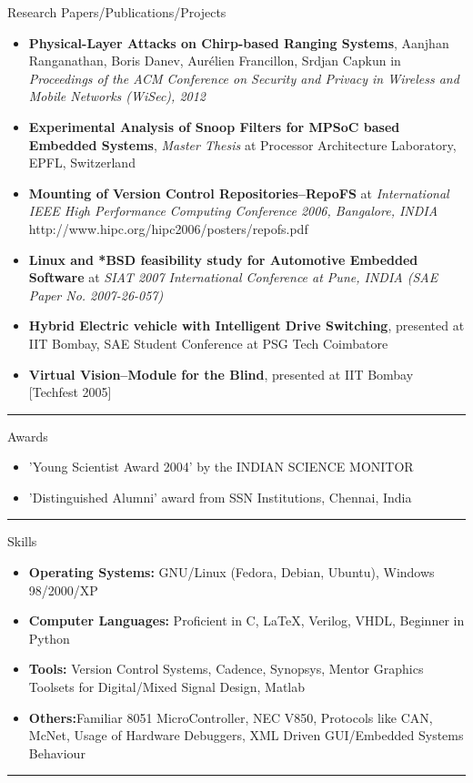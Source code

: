 \documentclass[11pt,oneside]{article}
\newenvironment{ressection}[1]{
	\vspace{4pt}
	{\fontfamily{phv}\selectfont\Large#1}
	\begin{itemize}
	\vspace{3pt}
}{
	\end{itemize}
}
\newcommand{\resitem}[1]{
	\vspace{-4pt}
	\item \begin{flushleft} #1 \end{flushleft}
}
\begin{document}
\begin{ressection}{Research Papers/Publications/Projects}
        \resitem{\textbf{Physical-Layer Attacks on Chirp-based Ranging Systems},
          Aanjhan Ranganathan, Boris Danev, Aur\'elien Francillon, Srdjan
          Capkun in \emph{Proceedings of the ACM Conference on Security and Privacy
          in Wireless and Mobile Networks (WiSec), 2012}}

      \resitem{\textbf{Experimental Analysis of Snoop Filters for MPSoC based
          Embedded Systems}, \emph{Master Thesis} at Processor Architecture
        Laboratory, EPFL, Switzerland}
        
      \resitem{\textbf{Mounting of Version Control Repositories--RepoFS} at
        \emph{International IEEE High Performance Computing Conference 2006,
          Bangalore, INDIA} http://www.hipc.org/hipc2006/posters/repofs.pdf}
    
      \resitem{\textbf{Linux and *BSD feasibility study for Automotive
          Embedded Software} at \emph{SIAT 2007 International Conference at
          Pune, INDIA (SAE Paper No. 2007-26-057)}}

      \resitem{\textbf{Hybrid Electric vehicle with Intelligent Drive
          Switching}, presented at IIT Bombay, SAE Student Conference at PSG
        Tech Coimbatore}

      \resitem{\textbf{Virtual Vision--Module for the Blind}, presented at IIT
        Bombay [Techfest 2005]}
\end{ressection}
\rule{\textwidth}{.5pt}

\newpage
\begin{ressection}{Awards}
        
        \resitem{'Young Scientist Award 2004' by the INDIAN SCIENCE MONITOR}
        \resitem{'Distinguished Alumni' award from SSN Institutions,
            Chennai, India}

\end{ressection}
\rule{\textwidth}{.5pt}

\begin{ressection}{Skills}

 	\resitem{\textbf{Operating Systems:} GNU/Linux (Fedora, Debian, Ubuntu), Windows 98/2000/XP}
 	\resitem{\textbf{Computer Languages:} Proficient in C, \LaTeX, Verilog, VHDL, Beginner in Python}
 	\resitem{\textbf{Tools:} Version Control Systems, Cadence, Synopsys, Mentor Graphics Toolsets for Digital/Mixed Signal Design, Matlab}
 	\resitem{\textbf{Others:}Familiar 8051 MicroController, NEC V850, Protocols like CAN, McNet, Usage of Hardware Debuggers, XML Driven GUI/Embedded Systems Behaviour}
 \end{ressection}
 \rule{\textwidth}{.5pt}
\end{document}
